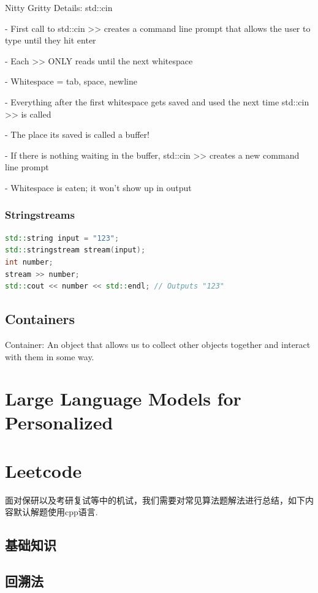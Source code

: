 \documentclass[12pt, a4paper, oneside]{ctexbook}
\begin{document}
Nitty Gritty Details: std::cin

- First call to std::cin >> creates a command line
prompt that allows the user to type until they hit enter

- Each >> ONLY reads until the next whitespace

- Whitespace = tab, space, newline

- Everything after the first whitespace gets saved and
used the next time std::cin >> is called

- The place its saved is called a buffer!

- If there is nothing waiting in the buffer, std::cin >>
creates a new command line prompt

- Whitespace is eaten; it won’t show up in output


\subsection{Stringstreams}

\begin{lstlisting}[language=c++]
std::string input = "123";
std::stringstream stream(input);
int number;
stream >> number;
std::cout << number << std::endl; // Outputs "123"
\end{lstlisting}


\section{Containers}

Container: An object that allows us to
collect other objects together and interact
with them in some way.





\chapter{Large Language Models for Personalized}



\chapter{Leetcode}

面对保研以及考研复试等中的机试，我们需要对常见算法题解法进行总结，如下内容默认解题使用cpp语言.

\section{基础知识}


\section{回溯法}
\end{document}
